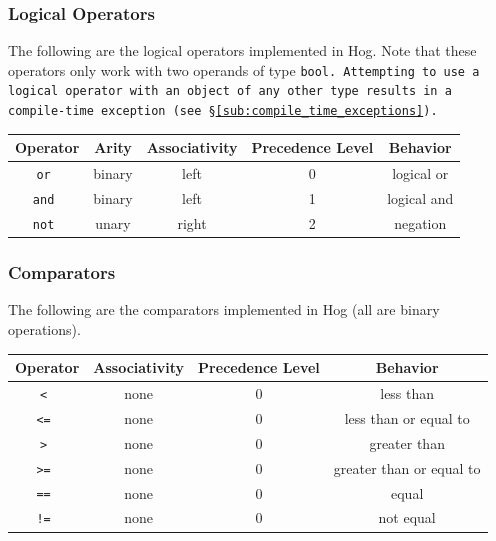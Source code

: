 \documentclass{article}
\begin{document}

\subsubsection{Logical Operators} %
\label{ssub:logical_operators}

The following are the logical operators implemented in Hog. Note that these
operators only work with two operands of type \tt bool\rm. Attempting to use a
logical operator with an object of any other type results in a compile-time
exception (see \S \ref{sub:compile_time_exceptions}).

\begin{center}
\begin{tabular}{|c|c|c|c|c|}

\hline \textbf{Operator} & \textbf{Arity} & \textbf{Associativity} &
\textbf{Precedence Level} & \textbf{Behavior} \\ \hline
\tt or \rm & binary & left & 0 & logical or \\ \hline
\tt and \rm & binary & left & 1 & logical and \\ \hline
\tt not \rm & unary & right & 2 & negation \\ \hline
\end{tabular}
\end{center}


\subsubsection{Comparators} %
\label{ssub:comparators}

The following are the comparators implemented in Hog (all are binary operations).

\begin{center}
\begin{tabular}{|c|c|c|c|}

\hline \textbf{Operator} & \textbf{Associativity} &
\textbf{Precedence Level} & \textbf{Behavior} \\ \hline
\tt < \rm & none & 0 & less than \\ \hline
\tt <= \rm & none & 0 & less than or equal to \\ \hline
\tt > \rm & none & 0 & greater than \\ \hline
\tt >= \rm & none & 0 & greater than or equal to \\ \hline
\tt == \rm & none & 0 & equal \\ \hline
\tt != \rm & none & 0 & not equal \\ \hline

\end{tabular}
\end{center}
\end{document}

